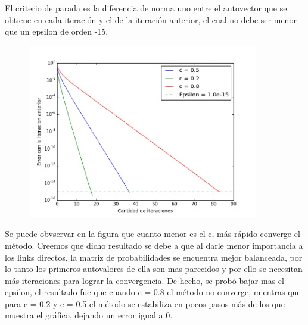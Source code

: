El criterio de parada es la diferencia de norma uno entre el autovector que se obtiene
en cada iteraci\'on y el de la iteraci\'on anterior, el cual no debe ser menor que un
epsilon de orden -15.

\begin{figure}[H]
  \centering
    \includegraphics[width=0.9\textwidth]{../parser/graficoError1.png}
    \caption{}
    \label{}
\end{figure}

Se puede obvservar en la figura que cuanto menor es el c, m\'as r\'apido converge
el m\'etodo. Creemos que dicho resultado se debe a que al darle menor importancia
a los links directos, la matriz de probabilidades se encuentra mejor balanceada, 
por lo tanto los primeros autovalores de ella son mas parecidos y por ello se necesitan
m\'as iteraciones para lograr la convergencia. De hecho, se prob\'o bajar mas el epsilon,
el resultado fue que cuando c = 0.8 el m\'etodo no converge, mientras que para c = 0.2 y
c = 0.5 el m\'etodo se estabiliza en pocos pasos m\'as de los que muestra el gr\'afico, dejando
un error igual a 0.




